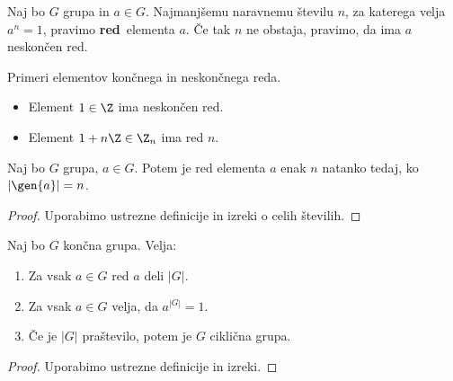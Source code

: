 \begin{definicija}
    Naj bo $G$ grupa in $a \in G$. Najmanjšemu naravnemu številu $n$, za katerega velja $a^n=1$, pravimo \textbf{red}~elementa $a$. Če tak $n$ ne obstaja, pravimo, da ima $a$ neskončen red.
\end{definicija}

\begin{primer}
    Primeri elementov končnega in neskončnega reda.
    \begin{itemize}
        \item Element $1 \in \Z$ ima neskončen red.
        \item Element $1 + n\Z \in \Z_n$ ima red $n$.
    \end{itemize}    
\end{primer}

\begin{trditev}
    Naj bo $G$ grupa, $a \in G$. Potem je red elementa $a$ enak $n$ natanko tedaj, ko $|\gen{a}| = n$.
\end{trditev}

\begin{proof}
    Uporabimo ustrezne definicije in izreki o celih številih.
\end{proof}

\begin{posledica}
    Naj bo $G$ končna grupa. Velja:
    \begin{enumerate}
        \item Za vsak $a \in G$ red $a$ deli $|G|$.
        \item Za vsak $a \in G$ velja, da $a^{|G|} = 1$.
        \item Če je $|G|$ praštevilo, potem je $G$ ciklična grupa. 
    \end{enumerate}
\end{posledica}

\begin{proof}
    Uporabimo ustrezne definicije in izreki.
\end{proof}